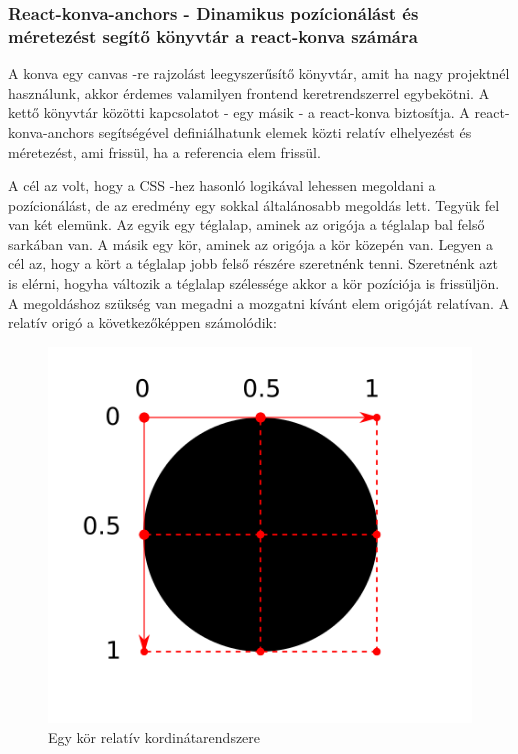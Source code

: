 \documentclass[a4paper,12pt,oneside]{report}
\begin{document}
\subsubsection{React-konva-anchors - Dinamikus pozícionálást és méretezést segítő könyvtár a react-konva számára}

\begin{justify}

	A konva egy canvas -re rajzolást leegyszerűsítő könyvtár, amit ha nagy projektnél használunk, akkor érdemes valamilyen frontend keretrendszerrel egybekötni. A kettő könyvtár közötti kapcsolatot - egy másik - a react-konva biztosítja. A react-konva-anchors segítségével definiálhatunk elemek közti relatív elhelyezést és méretezést, ami frissül, ha a referencia elem frissül. 

	A cél az volt, hogy a CSS -hez hasonló logikával lehessen megoldani a pozícionálást, de az eredmény egy sokkal általánosabb megoldás lett. Tegyük fel van két elemünk. Az egyik egy téglalap, aminek az origója a téglalap bal felső sarkában van. A másik egy kör, aminek az origója a kör közepén van. Legyen a cél az, hogy a kört a téglalap jobb felső részére szeretnénk tenni. Szeretnénk azt is elérni, hogyha változik a téglalap szélessége akkor a kör pozíciója is frissüljön. A megoldáshoz szükség van megadni a mozgatni kívánt elem origóját relatívan. A relatív origó a következőképpen számolódik:

	\begin{figure}[h]
		\includegraphics[width=\textwidth]{contents/images/position_anchor.png}
		\caption{ Egy kör relatív kordinátarendszere}
		\label{fig:position_anchor}
	\end{figure}


\end{justify}
\end{document}
